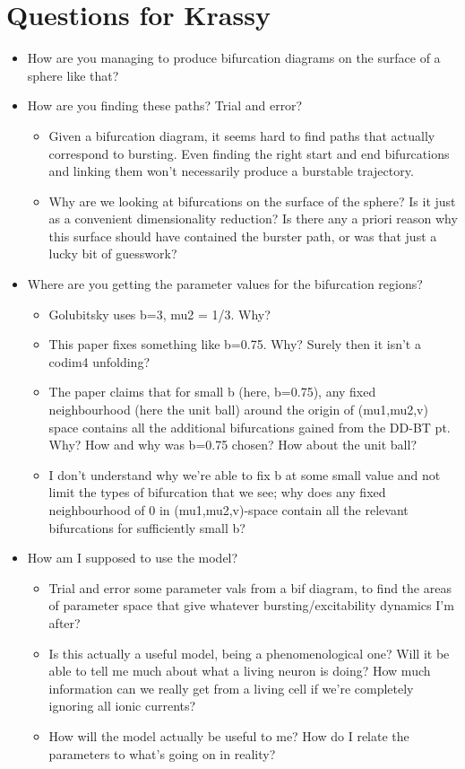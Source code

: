 \documentclass[11pt]{article}
\author{mark}
\date{\today}
\title{}
\begin{document}
\tableofcontents

\newpage
\section{Questions for Krassy}
\label{sec:org2bd77b7}
\begin{itemize}
\item How are you managing to produce bifurcation diagrams on the surface of a sphere like that?

\item How are you finding these paths? Trial and error?
\begin{itemize}
\item Given a bifurcation diagram, it seems hard to find paths that actually correspond to bursting. Even finding the right start and end bifurcations and linking them won't necessarily produce a burstable trajectory.
\item Why are we looking at bifurcations on the surface of the sphere? Is it just as a convenient dimensionality reduction? Is there any a priori reason why this surface should have contained the burster path, or was that just a lucky bit of guesswork?
\end{itemize}

\item Where are you getting the parameter values for the bifurcation regions?
\begin{itemize}
\item Golubitsky uses b=3, mu2 = 1/3. Why?
\item This paper fixes something like b=0.75. Why? Surely then it isn't a codim4 unfolding?
\item The paper claims that for small b (here, b=0.75), any fixed neighbourhood (here the unit ball) around the origin of (mu1,mu2,v) space contains all the additional bifurcations gained from the DD-BT pt. Why? How and why was b=0.75 chosen? How about the unit ball?
\item I don't understand why we're able to fix b at some small value and not limit the types of bifurcation that we see; why does any fixed neighbourhood of 0 in (mu1,mu2,v)-space contain all the relevant bifurcations for sufficiently small b?
\end{itemize}

\item How am I supposed to use the model?
\begin{itemize}
\item Trial and error some parameter vals from a bif diagram, to find the areas of parameter space that give whatever bursting/excitability dynamics I'm after?
\item Is this actually a useful model, being a phenomenological one? Will it be able to tell me much about what a living neuron is doing? How much information can we really get from a living cell if we're completely ignoring all ionic currents?
\item How will the model actually be useful to me? How do I relate the parameters to what's going on in reality?
\end{itemize}
\end{itemize}
\end{document}
